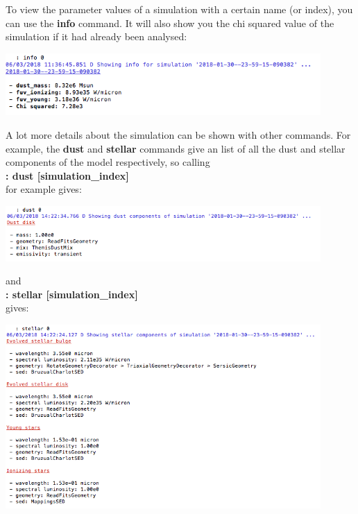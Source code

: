 \documentclass[15pt,a4paper,oneside,openright]{report}
\begin{document}
To view the parameter values of a simulation with a certain name (or index), you can use the \textbf{info} command. It will also show you the chi squared value of the simulation if it had already been analysed:

\begin{center}
\includegraphics[width=0.9\textwidth]{figures/info.png}
\end{center}

A lot more details about the simulation can be shown with other commands. For example, the \textbf{dust} and \textbf{stellar} commands give an list of all the  dust and stellar components of the model respectively, so calling\\

\textbf{: dust [simulation\_index]}\\

for example gives:

\begin{center}
\includegraphics[width=0.9\textwidth]{figures/dust.png}
\end{center}

and\\

\textbf{: stellar [simulation\_index]}\\

gives:

\begin{center}
\includegraphics[width=0.9\textwidth]{figures/stellar.png}
\end{center}
\end{document}
